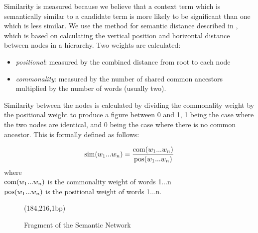 Similarity is measured because we
believe that a context term which is semantically similar to a
candidate term is more likely to be significant than one which is less
similar. We use the method for semantic distance
described in \cite{Maynard99b}, which is based on
calculating the vertical position and horizontal distance between nodes in a
hierarchy. Two weights are calculated:
\begin{itemize}
\item {\it positional}: measured by the combined distance from root
to each node
\item {\it commonality}: measured by the number of shared common
ancestors multiplied by the number of words (usually two).
\end{itemize}
Similarity between the nodes is calculated by dividing the commonality weight by the
positional weight to produce a figure between 0 and 1, 1 being the
case where the two nodes are identical, and 0 being the case where
there is no common ancestor. This is formally defined as follows:

\begin{equation}
\label{sim}
{\rm sim}(w_1...w_n) = \frac{{\rm com}(w_1...w_n)}{{\rm pos}(w_1...w_n)}
\end{equation}
where \\
\indent ${\rm com}(w_1...w_n)$ is the commonality weight of words 1...n\\
\indent ${\rm pos}(w_1...w_n)$ is the positional weight of words 1...n.
\vspace{\baselineskip}

\begin{figure}
\begin{center}
\begin{epsf}
\end{epsf}
\begin{draft}
\atari(184,216,1bp)
\end{draft}
\end{center}
\caption{Fragment of the Semantic Network}
\label{fig:umls}
\end{figure}

